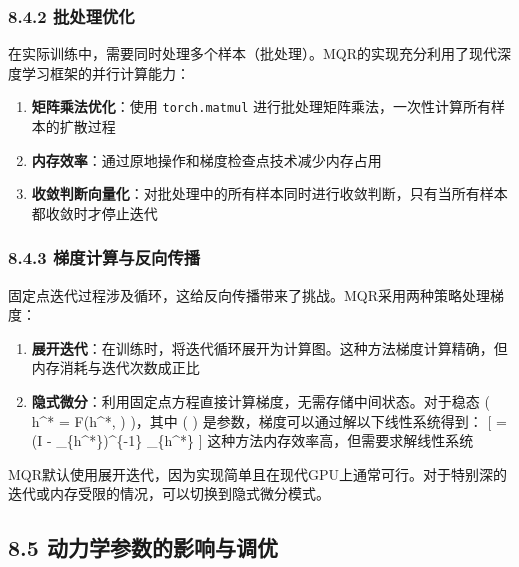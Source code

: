 \documentclass[
  12pt,
]{article}
\providecommand{\tightlist}{%
  \setlength{\itemsep}{0pt}\setlength{\parskip}{0pt}}
\begin{document}
\hypertarget{ux6279ux5904ux7406ux4f18ux5316}{%
\subsubsection{8.4.2 批处理优化}\label{ux6279ux5904ux7406ux4f18ux5316}}

在实际训练中，需要同时处理多个样本（批处理）。MQR的实现充分利用了现代深度学习框架的并行计算能力：

\begin{enumerate}
\def\labelenumi{\arabic{enumi}.}
\tightlist
\item
  \textbf{矩阵乘法优化}：使用 \texttt{torch.matmul}
  进行批处理矩阵乘法，一次性计算所有样本的扩散过程
\item
  \textbf{内存效率}：通过原地操作和梯度检查点技术减少内存占用
\item
  \textbf{收敛判断向量化}：对批处理中的所有样本同时进行收敛判断，只有当所有样本都收敛时才停止迭代
\end{enumerate}

\hypertarget{ux68afux5ea6ux8ba1ux7b97ux4e0eux53cdux5411ux4f20ux64ad}{%
\subsubsection{8.4.3
梯度计算与反向传播}\label{ux68afux5ea6ux8ba1ux7b97ux4e0eux53cdux5411ux4f20ux64ad}}

固定点迭代过程涉及循环，这给反向传播带来了挑战。MQR采用两种策略处理梯度：

\begin{enumerate}
\def\labelenumi{\arabic{enumi}.}
\tightlist
\item
  \textbf{展开迭代}：在训练时，将迭代循环展开为计算图。这种方法梯度计算精确，但内存消耗与迭代次数成正比
\item
  \textbf{隐式微分}：利用固定点方程直接计算梯度，无需存储中间状态。对于稳态
  ( h\^{}* = F(h\^{}*, \theta) )，其中 ( \theta )
  是参数，梯度可以通过解以下线性系统得到： {[}
   = \left(I -
  \bigg\textbar\_\{h\^{}*\}\right)\^{}\{-1\}
  \bigg\textbar\_\{h\^{}*\}
  {]} 这种方法内存效率高，但需要求解线性系统
\end{enumerate}

MQR默认使用展开迭代，因为实现简单且在现代GPU上通常可行。对于特别深的迭代或内存受限的情况，可以切换到隐式微分模式。

\hypertarget{ux52a8ux529bux5b66ux53c2ux6570ux7684ux5f71ux54cdux4e0eux8c03ux4f18}{%
\subsection{8.5
动力学参数的影响与调优}\label{ux52a8ux529bux5b66ux53c2ux6570ux7684ux5f71ux54cdux4e0eux8c03ux4f18}}
\end{document}
